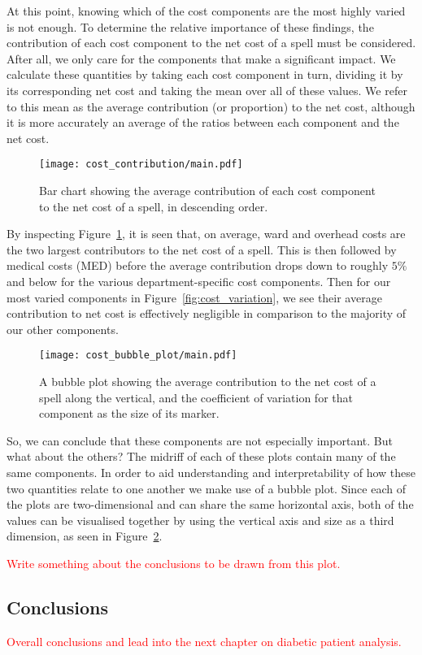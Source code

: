 At this point, knowing which of the cost components are the most highly varied
is not enough. To determine the relative importance of these findings, the
contribution of each cost component to the net cost of a spell must be
considered. After all, we only care for the components that make a significant
impact. We calculate these quantities by taking each cost component in turn,
dividing it by its corresponding net cost and taking the mean over all of these
values. We refer to this mean as the average contribution (or proportion) to the
net cost, although it is more accurately an average of the ratios between each
component and the net cost.

\begin{figure}[h]
    \centering
    \texttt{[image: cost\_contribution/main.pdf]}
    \caption{Bar chart showing the average contribution of each cost component
    to the net cost of a spell, in descending
    order.}\label{fig:cost_contribution}
\end{figure}

By inspecting Figure~\ref{fig:cost_contribution}, it is seen that, on average,
ward and overhead costs are the two largest contributors to the net cost of a
spell. This is then followed by medical costs (MED) before the average
contribution drops down to roughly \(5\%\) and below for the various
department-specific cost components. Then for our most varied components in
Figure~\ref{fig:cost_variation}, we see their average contribution to net cost
is effectively negligible in comparison to the majority of our other components.

\begin{figure}[h]
    \centering
    \texttt{[image: cost\_bubble\_plot/main.pdf]}
    \caption{A bubble plot showing the average contribution to the net cost of a
    spell along the vertical, and the coefficient of variation for that
    component as the size of its marker.}\label{fig:cost_bubble_plot}
\end{figure}

So, we can conclude that these components are not especially important. But what
about the others? The midriff of each of these plots contain many of the same
components. In order to aid understanding and interpretability of how these two
quantities relate to one another we make use of a bubble plot. Since each of the
plots are two-dimensional and can share the same horizontal axis, both of the
values can be visualised together by using the vertical axis and size as a third
dimension, as seen in Figure~\ref{fig:cost_bubble_plot}.

\textcolor{red}{%
    Write something about the conclusions to be drawn from this plot.
}

\subsection{Conclusions}

\textcolor{red}{%
    Overall conclusions and lead into the next chapter on diabetic patient
    analysis.
}
